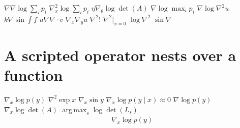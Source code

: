 \documentclass{article}
\begin{document}
$\nabla\nabla\log\sum_{i}p_{i}$ $\nabla_{x}^{2}\log\sum_{i}p_{i}$ $\eta\nabla_{\theta}\log\det(A)$
$\nabla\log\max_{i}p_{i}$ $\nabla\log\nabla^{2}u$ $k\nabla\sin\int f$ $u\nabla\nabla\cdot v$
$\nabla_{x}\nabla_{y}u$ $\nabla^{2}!$ $\nabla^{2}|_{x=0}$ $\log\nabla^{2}$ $\sin\nabla$

\section{A scripted operator nests over a function}
$\nabla_{x}\log p(y)$ $\nabla^{2}\exp x$ $\nabla_{x}\sin y$ $\nabla_{x}\log p(y\mid x)\approx 0$ $\nabla\log p(y)$
$\nabla_{x}\log\det(A)$ $\operatorname*{arg\,max}_{s}\log\det(L_{s})$
\[\begin{split}\nabla_{x}\log p(y)\end{split}\]

\end{document}
